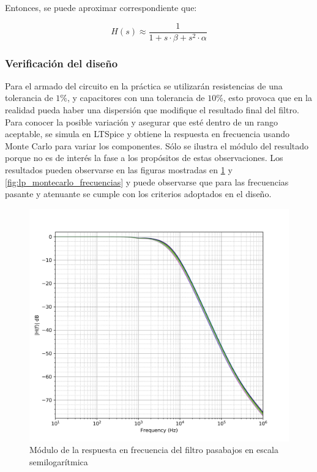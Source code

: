 Entonces, se puede aproximar correspondiente que:

\begin{equation}
    H(s) \approx \frac{1}{1 + s \cdot \beta + s^{2} \cdot \alpha}
\end{equation}

\subsubsection{Verificaci\'on del dise\~no}
Para el armado del circuito en la pr\'actica se utilizar\'an resistencias de una tolerancia de $1\%$, y capacitores con una tolerancia de $10\%$, esto provoca que en la realidad
pueda haber una dispersi\'on que modifique el resultado final del filtro. Para conocer la posible variaci\'on y asegurar que est\'e dentro de un rango aceptable, se simula en LTSpice
y obtiene la respuesta en frecuencia usando Monte Carlo para variar los componentes. S\'olo se ilustra el m\'odulo del resultado porque no es de inter\'es la fase a los prop\'ositos de estas observaciones. 
Los resultados pueden observarse en las figuras mostradas en \ref{fig:lp_montecarlo} y \ref{fig:lp_montecarlo_frecuencias} y puede observarse que para las frecuencias pasante y atenuante se cumple con los criterios
adoptados en el dise\~no.

\begin{figure}[H]
    \centering
    \includegraphics[scale=0.12]{../EJ2/Recursos/lp_montecarlo.png}
    \caption{M\'odulo de la respuesta en frecuencia del filtro pasabajos en escala semilogar\'itmica}
    \label{fig:lp_montecarlo}
\end{figure}

